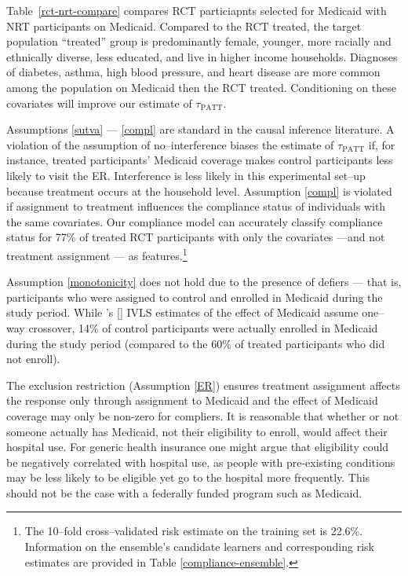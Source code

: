 \documentclass[12pt]{article}
\newcommand{\possessivecite}[1]{\citeauthor{#1}'s [\citeyear{#1}]}
\begin{document}
Table~\ref{rct-nrt-compare} compares RCT particiapnts selected for Medicaid with NRT participants on Medicaid. Compared to the RCT treated, the target population ``treated''  group is predominantly female, younger, more racially and ethnically diverse, less educated, and live in higher income households. Diagnoses of diabetes, asthma, high blood pressure, and heart disease are more common among the population on Medicaid then the RCT treated. Conditioning on these covariates will improve our estimate of $\tau_{\text{PATT}}$. 


Assumptions \ref{sutva} ---  \ref{compl} are standard in the causal inference literature. A violation of the assumption of no--interference biases the estimate of $\tau_{\text{PATT}}$ if, for instance, treated participants' Medicaid coverage makes control participants less likely to visit the ER. Interference is less likely in this experimental set--up because treatment occurs at the household level.  Assumption \ref{compl} is violated if assignment to treatment influences the compliance status of individuals with the same covariates. Our compliance model can accurately classify compliance status for 77\% of treated RCT participants with only the covariates ---and not treatment assignment --- as features.\footnote{The 10--fold cross--validated risk estimate on the training set is 22.6\%. Information on the ensemble's candidate learners and corresponding risk estimates are provided in Table \ref{compliance-ensemble}.}
 
Assumption \ref{monotonicity} does not hold due to the presence of defiers --- that is, participants who were assigned to control and enrolled in Medicaid during the study period. While \possessivecite{finkelstein2012} IVLS estimates of the effect of Medicaid assume one--way crossover, 14\% of control participants were actually enrolled in Medicaid during the study period (compared to the 60\% of treated participants who did not enroll).

The exclusion restriction (Assumption \ref{ER}) ensures treatment assignment affects the response only through assignment to Medicaid  and the effect of Medicaid coverage may only be non-zero for compliers. It is reasonable that whether or not someone actually has Medicaid, not their eligibility to enroll, would affect their hospital use.  For generic health insurance one might argue that eligibility could be negatively correlated with hospital use, as people with pre-existing conditions may be less likely to be eligible yet go to the hospital more frequently.  This should not be the case with a federally funded program such as Medicaid. 
 
\end{document}
